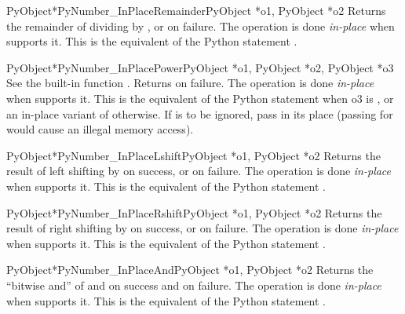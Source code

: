 \begin{cfuncdesc}{PyObject*}{PyNumber_InPlaceRemainder}{PyObject *o1,
                                                        PyObject *o2}
  Returns the remainder of dividing  by , or \NULL{}
  on failure.  The operation is done \emph{in-place} when 
  supports it.  This is the equivalent of the Python statement
  .
\end{cfuncdesc}


\begin{cfuncdesc}{PyObject*}{PyNumber_InPlacePower}{PyObject *o1,
                                                    PyObject *o2, PyObject *o3}
  See the built-in function .
  Returns \NULL{} on failure.  The operation is done \emph{in-place}
  when  supports it.  This is the equivalent of the Python
  statement  when o3 is ,
  or an in-place variant of 
  otherwise. If  is to be ignored, pass  in its
  place (passing \NULL{} for  would cause an illegal memory
  access).
\end{cfuncdesc}

\begin{cfuncdesc}{PyObject*}{PyNumber_InPlaceLshift}{PyObject *o1,
                                                     PyObject *o2}
  Returns the result of left shifting  by  on success,
  or \NULL{} on failure.  The operation is done \emph{in-place} when
   supports it.  This is the equivalent of the Python
  statement .
\end{cfuncdesc}


\begin{cfuncdesc}{PyObject*}{PyNumber_InPlaceRshift}{PyObject *o1,
                                                     PyObject *o2}
  Returns the result of right shifting  by  on
  success, or \NULL{} on failure.  The operation is done
  \emph{in-place} when  supports it.  This is the equivalent
  of the Python statement .
\end{cfuncdesc}


\begin{cfuncdesc}{PyObject*}{PyNumber_InPlaceAnd}{PyObject *o1, PyObject *o2}
  Returns the ``bitwise and'' of  and  on success and
  \NULL{} on failure. The operation is done \emph{in-place} when
   supports it.  This is the equivalent of the Python
  statement .
\end{cfuncdesc}


